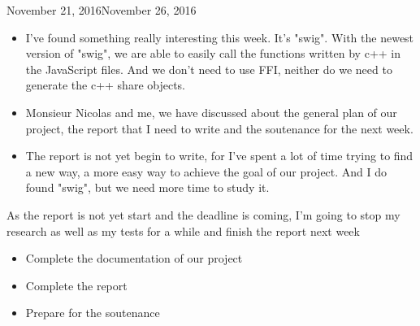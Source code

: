 \begin{fichesuivi}{November 21, 2016}{November 26, 2016}

   \begin{travaileffectue}
        \begin{itemize}
            \item I've found something really interesting this week. It's "swig". With the newest version of "swig", we are able to easily call the functions written by c++ in the JavaScript files. And we don't need to use FFI, neither do we need to generate the c++ share objects.
            \item Monsieur Nicolas and me, we have discussed about the general plan of our project, the report that I need to write and the soutenance for the next week.
        \end{itemize}
   \end{travaileffectue}

   \begin{travailnoneffectue}
        \begin{itemize}
            \item The report is not yet begin to write, for I've spent a lot of time trying to find a new way, a more easy way to achieve the goal of our project. And I do found "swig", but we need more time to study it.
        \end{itemize}
   \end{travailnoneffectue}

   \begin{planification}
        As the report is not yet start and the deadline is coming, I'm going to stop my research as well as my tests for a while and finish the report next week
        \begin{itemize}
            \item Complete the documentation of our project 
            \item Complete the report
            \item Prepare for the soutenance
        \end{itemize}
   \end{planification}
\end{fichesuivi}
 



